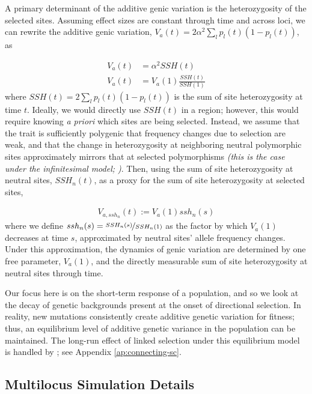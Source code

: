 \documentclass[11pt]{article}
\newcommand{\vb}[1]{{\it \color{blue} #1}}
\begin{document}
A primary determinant of the additive genic variation is the heterozygosity of
the selected sites. Assuming effect sizes are constant through time and across
loci, we can rewrite the additive genic variation, $V_a(t) = 2 \alpha^2 \sum_l
p_l(t) (1-p_l(t))$, as

\begin{align}
  \label{eq:VA-SSH}
  V_a(t) &= \alpha^2 SSH(t) \\
  V_a(t) &= V_a(1) \frac{SSH(t)}{SSH(1)}
\end{align}
%
where $SSH(t) = 2 \sum_l p_l(t) (1-p_l(t))$ is the sum of site heterozygosity
at time $t$.  Ideally, we would directly use $SSH(t)$ in a region; however,
this would require knowing \emph{a priori} which sites are being selected.
Instead, we assume that the trait is sufficiently polygenic that frequency
changes due to selection are weak, and that the change in heterozygosity at
neighboring neutral polymorphic sites approximately mirrors that at selected
polymorphisms \vb{(this is the case under the infinitesimal model;
\parencite{Barton2017-ac,Turelli2017-sw})}. Then, using the sum of site
heterozygosity at neutral sites, $SSH_n(t)$, as a proxy for the sum of site
heterozygosity at selected sites, 

\begin{align}
  V_{a,ssh_n}(t) := V_a(1) ssh_n(s)
  \label{eq:VA-ssh}
\end{align}
%
where we define $ssh_n(s) = \nicefrac{SSH_n(s)}{SSH_n(1)}$ as the factor by
which $V_a(1)$ decreases at time $s$, approximated by neutral sites' allele
frequency changes. Under this approximation, the dynamics of genic variation
are determined by one free parameter, $V_a(1)$, and the directly measurable sum of
site heterozygosity at neutral sites through time. 

Our focus here is on the short-term response of a population, and so we look at
the decay of genetic backgrounds present at the onset of directional selection.
In reality, new mutations consistently create additive genetic variation for
fitness; thus, an equilibrium level of additive genetic variance in the
population can be maintained. The long-run effect of linked selection under
this equilibrium model is handled by
\textcite{Santiago1995-hx,Santiago1998-bs}; see Appendix
\ref{ap:connecting-sc}.

\subsection{Multilocus Simulation Details}
\label{sec:ml-sim}
\end{document}
